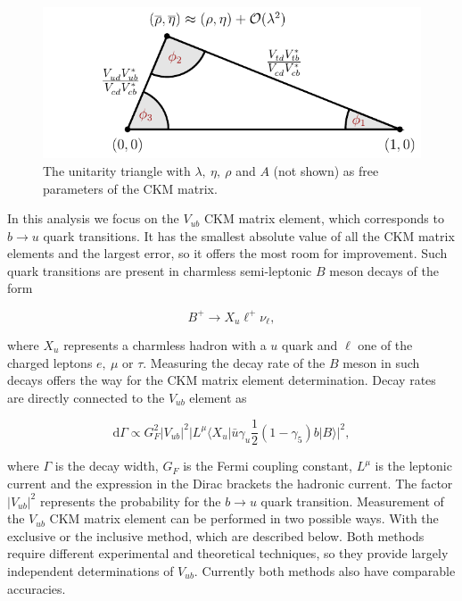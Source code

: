 \documentclass[  headings=standardclasses,
  headings=big,oneside,a4paper,openany,12pt]{scrbook}
\begin{document}
\begin{figure}[H]
\centering
\includegraphics[scale=1]{texfig/UT_Triangle}
\caption{The unitarity triangle with $\lambda,~\eta,~\rho$ and $A$ (not shown) as free parameters of the CKM matrix.}
\label{ut}
\end{figure}

In this analysis we focus on the $V_{ub}$ CKM matrix element, which corresponds to $b \rightarrow u$ quark transitions. It has the smallest absolute value of all the CKM matrix elements and the largest error, so it offers the most room for improvement. Such quark transitions are present in charmless semi-leptonic $B$ meson decays of the form

\begin{equation}
B^+ \to X_u \ell^+ \nu_\ell,
\end{equation}

where $X_u$ represents a charmless hadron with a $u$ quark and $\ell$ one of the charged leptons $e,~\mu$ or $\tau$. Measuring the decay rate of the $B$ meson in such decays offers the way for the CKM matrix element determination. Decay rates are directly connected to the $V_{ub}$ element as

\begin{equation}
\mathrm{d} \Gamma \propto G_F^2 \vert V_{ub} \vert ^2 \vert L^\mu \langle X_u \vert \bar u \gamma_u \frac{1}{2} (1-\gamma_5) b \vert B \rangle \vert ^2,
\end{equation}

where $\Gamma$ is the decay width, $G_F$ is the Fermi coupling constant, $L^\mu$ is the leptonic current and the expression in the Dirac brackets the hadronic current. The factor $\vert V_{ub} \vert ^2$ represents the probability for the $b \rightarrow u$ quark transition. Measurement of the $V_{ub}$ CKM matrix element can be performed in two possible ways. With the exclusive or the inclusive method, which are described below. Both methods require different experimental and theoretical techniques, so they provide largely independent determinations of $V_{ub}$. Currently both methods also have comparable accuracies. %
\end{document}

